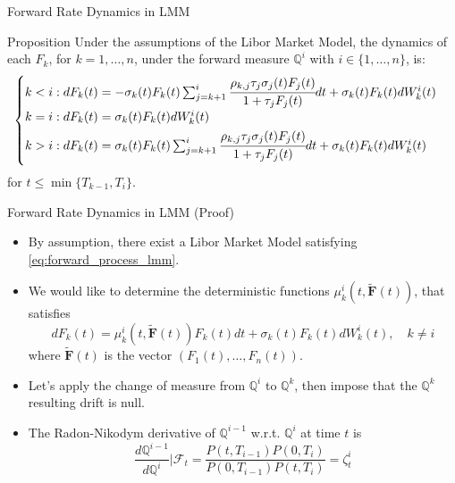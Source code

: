 \documentclass{beamer}
\begin{document}
\begin{frame}{Forward Rate Dynamics in LMM}
  \begin{block}{Proposition}
    Under the assumptions of the Libor Market Model, the dynamics of each $F_k$, for $k = 1,\ldots, n$, under the forward measure $\mathbb{Q}^i$ with $i \in \{1,\ldots, n\}$, is:
    \begin{equation}
      \begin{cases}
	k < i: dF_k(t) = -\sigma_k(t)F_k(t)\sum_{j=k+1}^i\cfrac{\rho_{k,j}\tau_j\sigma_j(t)F_j(t)}{1+\tau_jF_j(t)}dt + \sigma_k(t)F_k(t)dW^i_k(t) \\ \vspace{0.1cm}
	k = i : dF_k(t) = \sigma_k(t)F_k(t)dW_k^i(t) \\
	\vspace{0.1cm}
	k > i : dF_k(t) = \sigma_k(t)F_k(t)\sum_{j=k+1}^i\cfrac{\rho_{k,j}\tau_j\sigma_j(t)F_j(t)}{1+\tau_jF_j(t)}dt + \sigma_k(t)F_k(t)dW^i_k(t)		
      \end{cases}
  	\label{eq:forward_rat_dynamics_lfm}
    \end{equation}
    for $t \le \min\{T_{k-1}, T_i\}$.
  \end{block}
\end{frame}

\begin{frame}{Forward Rate Dynamics in LMM (Proof)}
  \begin{itemize}
  \item<1-> By assumption, there exist a Libor Market Model satisfying \cref{eq:forward_process_lmm}.
  \item<2-> We would like to determine the deterministic functions $\mu_k^i(t, \bm{\tilde{F}}(t))$, that satisfies
    \begin{equation}
      dF_k(t) = \mu_k^i(t, \bm{\tilde{F}}(t))F_k(t)dt + \sigma_k(t)F_k(t)dW^i_k(t),\quad k\neq i
      \label{eq:forward_dynamics_in_lfm}
    \end{equation}
 where $\bm{\tilde{F}}(t)$ is the vector $(F_1(t),\ldots, F_n(t))$.
  \item<3-> Let's apply the change of measure from $\mathbb{Q}^i$ to $\mathbb{Q}^k$, then impose that the $\mathbb{Q}^k$ resulting drift is null. 
  \item<4-> The Radon-Nikodym derivative of $\mathbb{Q}^{i-1}$ w.r.t. $\mathbb{Q}^i$ at time $t$ is
    \begin{equation*}
      \frac{d\mathbb{Q}^{i-1}}{d\mathbb{Q}^i}\bigg|\mathcal{F}_t = \frac{P(t, T_{i-1})P(0, T_i)}{P(0, T_{i-1})P(t, T_i)} = \zeta^i_t
    \end{equation*}
  \end{itemize}
\end{frame}
\end{document}
